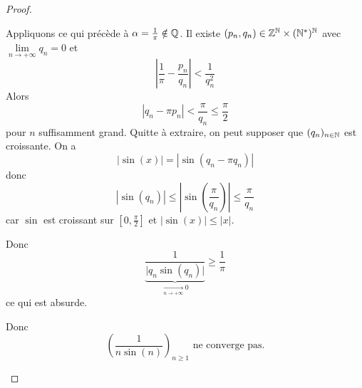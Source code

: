 \begin{proof}
\begin{enumerate}
		Appliquons ce qui précède à $\alpha=\frac{1}{\pi}\notin\mathbb{Q}$. Il existe $(p_{n},q_{n})\in\mathbb{Z}^{\mathbb{N}}\times(\mathbb{N}^{*})^{\mathbb{N}}$ avec $\lim\limits_{n\to+\infty}q_{n}=0$ et 
		$$\left\vert\frac{1}{\pi}-\frac{p_{n}}{q_{n}}\right\vert<\frac{1}{q_{n}^{2}}$$
		Alors 
		$$\left\vert q_{n}-\pi p_{n}\right\vert<\frac{\pi}{q_{n}}\leqslant\frac{\pi}{2}$$
		pour $n$ suffisamment grand. Quitte à extraire, on peut supposer que $(q_{n})_{n\in\mathbb{N}}$ est croissante. On a
		$$\left\vert\sin(x)\right\vert=\left\vert\sin(q_n-\pi q_n)\right\vert$$
		donc 
		$$\left\vert\sin(q_n)\right\vert\leqslant\left\vert\sin\left(\frac{\pi}{q_n}\right)\right\vert\leqslant\frac{\pi}{q_n}$$
		car $\sin$ est croissant sur $\left[0,\frac{\pi}{2}\right]$ et $\vert\sin(x)\vert\leqslant\vert x\vert$.

		Donc 
		$$\underbrace{\frac{1}{\vert q_n\sin(q_n)\vert}}_{\xrightarrow[n\to+\infty]{}0}\geqslant\frac{1}{\pi}$$
		ce qui est absurde.

		Donc 
		$$\boxed{\left(\frac{1}{n\sin(n)}\right)_{n\geqslant1}\text{ ne converge pas.}}$$
	\end{enumerate}
\end{proof}

